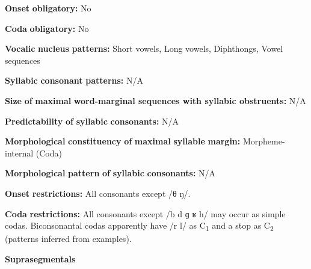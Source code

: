 \documentclass[output=paper]{langsci/langscibook}
\begin{document}
\begin{styleBody}
\textbf{Onset} \textbf{obligatory:} No
\end{styleBody}

\begin{styleBody}
\textbf{Coda} \textbf{obligatory:} No
\end{styleBody}

\begin{styleBody}
\textbf{Vocalic} \textbf{nucleus} \textbf{patterns:} Short vowels, Long vowels, Diphthongs, Vowel sequences
\end{styleBody}

\begin{styleBody}
\textbf{Syllabic} \textbf{consonant} \textbf{patterns:} N/A
\end{styleBody}

\begin{styleBody}
\textbf{Size} \textbf{of} \textbf{maximal} \textbf{word{}-marginal sequences with syllabic obstruents:} N/A
\end{styleBody}

\begin{styleBody}
\textbf{Predictability} \textbf{of} \textbf{syllabic} \textbf{consonants:} N/A
\end{styleBody}

\begin{styleBody}
\textbf{Morphological} \textbf{constituency} \textbf{of} \textbf{maximal} \textbf{syllable} \textbf{margin:} Morpheme-internal (Coda)
\end{styleBody}

\begin{styleBody}
\textbf{Morphological} \textbf{pattern} \textbf{of} \textbf{syllabic} \textbf{consonants:} N/A
\end{styleBody}

\begin{styleBody}
\textbf{Onset} \textbf{restrictions:} All consonants except /θ ŋ/.
\end{styleBody}

\begin{styleBody}
\textbf{Coda} \textbf{restrictions:} All consonants except /b d ɡ ʁ h/ may occur as simple codas. Biconsonantal codas apparently have /r l/ as C\textsubscript{1} and a stop as C\textsubscript{2} (patterns inferred from examples).
\end{styleBody}

\begin{styleBody}
\textbf{Suprasegmentals}
\end{styleBody}
\end{document}
